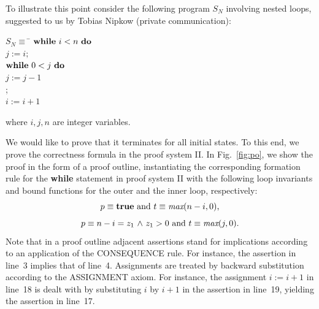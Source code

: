\documentclass[runningheads]{llncs}       %
\begin{document}
To illustrate this point consider the following program $S_N$ involving nested
loops, suggested to us by Tobias Nipkow (private communication):

\begin{tabbing}
\qquad\qquad
$S_N \equiv$ \= $\mbox{$\mbox{{\bf while}\ } {i < n}\ \mbox{{\bf do}\ }$}$           \\
\> \qquad $j:=i; $                     \\
\> \qquad $\mbox{$\mbox{{\bf while}\ } {0 < j}\ \mbox{{\bf do}\ }$}$                 \\
\> \qquad \qquad $j:=j-1$              \\
\> \qquad \OD ;                        \\
\> \qquad $i:=i+1$                     \\
\> \OD                                               
\end{tabbing}
\noindent
where $i, j, n$ are integer variables. 

\III

We would like to prove that it terminates
for all initial states. To this end, we prove the correctness formula
 in the proof system II.
In Fig.~\ref{fig:po}, we show the proof in the form of a proof outline,
instantiating the corresponding formation rule for the \textbf{while} statement in proof system II
with the following loop invariants and bound functions for the outer and the inner loop, respectively:                                                  \\
\[
  \mbox{$p \equiv \mbox{{\bf true}}$ and $t \equiv  \mbox{\it max}(n-i,0)$,}
\]
\[
  \mbox{$p \equiv  n-i = z_1 \mbox{$\ \wedge\ $} z_1>0$ and $t \equiv \mbox{\it max}(j,0)$.}
\]
Note that in a proof outline adjacent assertions stand for implications
according to an application of the CONSEQUENCE rule.
For instance, the assertion in line~3 implies that of line~4.
Assignments are treated by backward substitution according to the ASSIGNMENT axiom.
For instance, the assignment $i:=i+1$ in line~18 is dealt with by 
substituting $i$ by $i+1$ in the assertion in line~19, yielding
the assertion in line~17.
\end{document}
